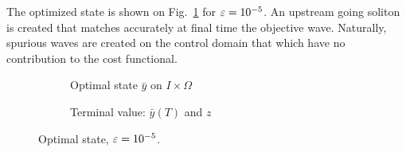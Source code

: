 The optimized state is shown on Fig.~\ref{ex2fullgammadm5} for $\varepsilon = 10^{-5}$. An upstream going soliton is created that matches accurately at final time the objective wave. Naturally, spurious waves are created on the control domain that which have no contribution to the cost functional.
\begin{figure}[htb]
 \begin{subfigure}[b]{0.48\textwidth}
 \centering
 
 \caption{Optimal state $\bar y$ on $I\times\Omega$}
 \end{subfigure}\qquad
 \begin{subfigure}[b]{0.48\textwidth}
 \centering
 
 \caption{Terminal value: $\bar y(T)$ and $z$ }
 \end{subfigure}
 \caption{Optimal state, $\varepsilon = 10^{-5}$.}
 \label{ex2fullgammadm5}
\end{figure}




